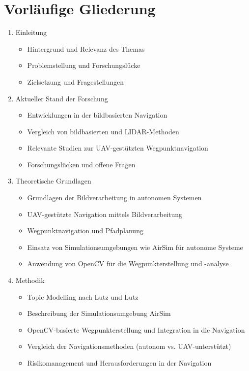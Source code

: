 \section{Vorläufige Gliederung}

\begin{enumerate}
    \item Einleitung
    \begin{itemize}
        \item Hintergrund und Relevanz des Themas
        \item Problemstellung und Forschungslücke
        \item Zielsetzung und Fragestellungen
    \end{itemize}
    
    \item Aktueller Stand der Forschung
    \begin{itemize}
        \item Entwicklungen in der bildbasierten Navigation
        \item Vergleich von bildbasierten und \gls{LIDAR}-Methoden
        \item Relevante Studien zur UAV-gestützten Wegpunktnavigation
        \item Forschungslücken und offene Fragen
    \end{itemize}
    
    \item Theoretische Grundlagen
    \begin{itemize}
        \item Grundlagen der Bildverarbeitung in autonomen Systemen
        \item UAV-gestützte Navigation mittels Bildverarbeitung
        \item Wegpunktnavigation und Pfadplanung
        \item Einsatz von Simulationsumgebungen wie \gls{AirSim} für autonome Systeme
        \item Anwendung von \gls{OpenCV} für die Wegpunkterstellung und -analyse
    \end{itemize}
    
    \item Methodik
    \begin{itemize}
        \item Topic Modelling nach Lutz und Lutz
        \item Beschreibung der Simulationsumgebung \gls{AirSim}
        \item \gls{OpenCV}-basierte Wegpunkterstellung und Integration in die Navigation
        \item Vergleich der Navigationsmethoden (autonom vs. UAV-unterstützt)
        \item Risikomanagement und Herausforderungen in der Navigation
    \end{itemize}
    

\end{enumerate}
